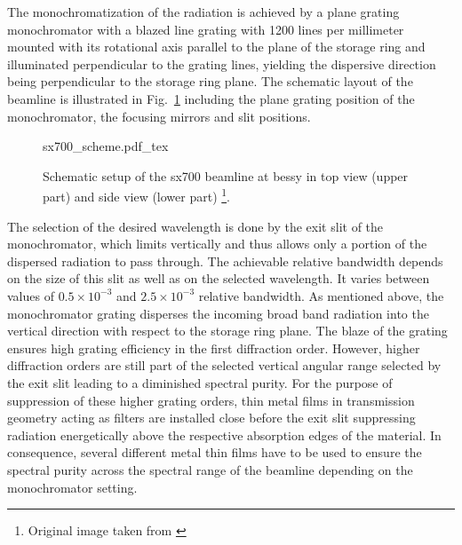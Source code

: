 The monochromatization of the radiation is achieved by a plane grating monochromator with a blazed line grating with 1200 lines per millimeter mounted with its rotational axis parallel to the plane of the storage ring and illuminated perpendicular to the grating lines, yielding the dispersive direction being perpendicular to the storage ring plane. The schematic layout of the beamline is illustrated in Fig.~\ref{ch_exp:fig_sx700_schematic} including the plane grating position of the monochromator, the focusing mirrors and slit positions.
\begin{figure}[htb]
    \def\svgwidth{\textwidth}
    {sx700_scheme.pdf_tex}
    \caption[Schematic setup of the SX700 beamline.]{Schematic setup of the \gls{sx700} beamline at \gls{bessy} in top view (upper part) and side view (lower part) \footnote{Original image taken from \textcite{scholze_high-accuracy_2001}}.}
    \label{ch_exp:fig_sx700_schematic}
\end{figure}
The selection of the desired wavelength is done by the exit slit of the monochromator, which limits vertically and thus allows only a portion of the dispersed radiation to pass through. The achievable relative bandwidth depends on the size of this slit as well as on the selected wavelength. It varies between values of $0.5\times 10^{-3}$ and $2.5\times 10^{-3}$ relative bandwidth. As mentioned above, the monochromator grating disperses the incoming broad band radiation into the vertical direction with respect to the storage ring plane. The blaze of the grating ensures high grating efficiency in the first diffraction order. However, higher diffraction orders are still part of the selected vertical angular range selected by the exit slit leading to a diminished spectral purity. For the purpose of suppression of these higher grating orders, thin metal films in transmission geometry acting as filters are installed close before the exit slit suppressing radiation energetically above the respective absorption edges of the material. In consequence, several different metal thin films have to be used to ensure the spectral purity across the spectral range of the beamline depending on the monochromator setting.

